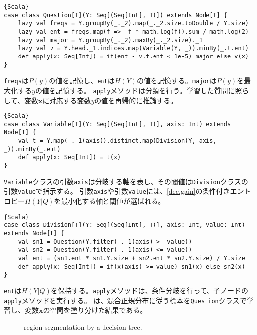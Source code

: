 \documentclass[10pt,a4paper]{book}
\begin{document}
\begin{Verbatim}{Scala}
case class Question[T](Y: Seq[(Seq[Int], T)]) extends Node[T] {
	lazy val freqs = Y.groupBy(_._2).map(_._2.size.toDouble / Y.size)
	lazy val ent = freqs.map(f => -f * math.log(f)).sum / math.log(2)
	lazy val major = Y.groupBy(_._2).maxBy(_._2.size)._1
	lazy val v = Y.head._1.indices.map(Variable(Y, _)).minBy(_.t.ent)
	def apply(x: Seq[Int]) = if(ent - v.t.ent < 1e-5) major else v(x)
}
\end{Verbatim}

\texttt{freqs}は$P(y)$の値を記憶し、\texttt{ent}は$H(Y)$の値を記憶する。\texttt{major}は$P(y)$を最大化する$y$の値を記憶する。
\texttt{apply}メソッドは分類を行う。学習した質問に照らして、変数$\bm{x}$に対応する変数$y$の値を再帰的に推論する。

\begin{Verbatim}{Scala}
case class Variable[T](Y: Seq[(Seq[Int], T)], axis: Int) extends Node[T] {
	val t = Y.map(_._1(axis)).distinct.map(Division(Y, axis, _)).minBy(_.ent)
	def apply(x: Seq[Int]) = t(x)
}
\end{Verbatim}

\texttt{Variable}クラスの引数\texttt{axis}は分岐する軸を表し、その閾値は\texttt{Division}クラスの引数\texttt{value}で指示する。
引数\texttt{axis}や引数\texttt{value}には、\eqref{dec.gain}の条件付きエントロピー$H(Y|Q)$を最小化する軸と閾値が選ばれる。

\begin{Verbatim}{Scala}
case class Division[T](Y: Seq[(Seq[Int], T)], axis: Int, value: Int) extends Node[T] {
	val sn1 = Question(Y.filter(_._1(axis) >  value))
	val sn2 = Question(Y.filter(_._1(axis) <= value))
	val ent = (sn1.ent * sn1.Y.size + sn2.ent * sn2.Y.size) / Y.size
	def apply(x: Seq[Int]) = if(x(axis) >= value) sn1(x) else sn2(x)
}
\end{Verbatim}

\texttt{ent}は$H(Y|Q)$を保持する。\texttt{apply}メソッドは、条件分岐を行って、子ノードの\texttt{apply}メソッドを実行する。
は、混合正規分布に従う標本を\texttt{Question}クラスで学習し、変数$\bm{x}$の空間を塗り分けた結果である。

\begin{figure}[h]
\centering
{}
\caption{region segmentation by a decision tree.\label{fig:dec.plain}}
\end{figure}
\end{document}
